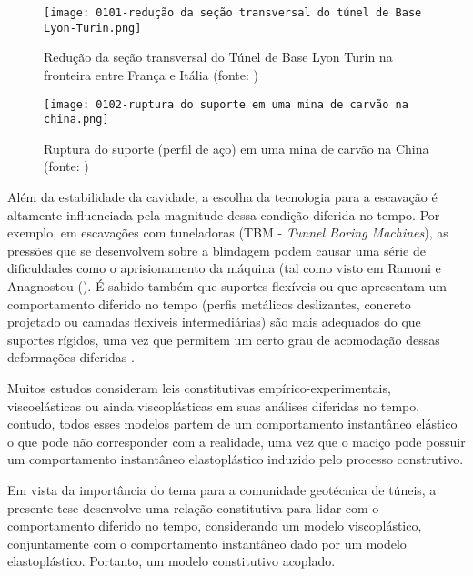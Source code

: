\begin{figure}[H]
	\begin{center}
		\texttt{[image: 0101-redução da seção transversal do túnel de Base Lyon-Turin.png]}
	\end{center}
	\caption{\label{redução_base_turin}Redução da seção transversal do Túnel de Base Lyon Turin na fronteira entre França e Itália (fonte: )}
\end{figure}

\begin{figure}[H]
	\begin{center}
		\texttt{[image: 0102-ruptura do suporte em uma mina de carvão na china.png]}
	\end{center}
	\caption{\label{ruptura_china}Ruptura do suporte (perfil de aço) em uma mina de carvão na China (fonte: )}
\end{figure}
 
Além da estabilidade da cavidade, a escolha da tecnologia para a escavação é altamente influenciada pela magnitude dessa condição diferida no tempo. Por exemplo, em escavações com tuneladoras (TBM - \textit{Tunnel Boring Machines}), as pressões que se desenvolvem sobre a blindagem podem causar uma série de dificuldades como o aprisionamento da máquina (tal como visto em Ramoni e Anagnostou (\citeyear{Ramoni2010a,Ramoni2010b}). É sabido também que suportes flexíveis ou que apresentam um comportamento diferido no tempo (perfis metálicos deslizantes, concreto projetado ou camadas flexíveis intermediárias) são mais adequados do que suportes rígidos, uma vez que permitem um certo grau de acomodação dessas deformações diferidas \cite{Wu2019}.

Muitos estudos consideram leis constitutivas empírico-experimentais, viscoelásticas ou ainda viscoplásticas em suas análises diferidas no tempo, contudo, todos esses modelos partem de um comportamento instantâneo elástico o que pode não corresponder com a realidade, uma vez que o maciço pode possuir um comportamento instantâneo elastoplástico induzido pelo processo construtivo.

Em vista da importância do tema para a comunidade geotécnica de túneis, a presente tese desenvolve uma relação constitutiva para lidar com o comportamento diferido no tempo, considerando um modelo viscoplástico, conjuntamente com o comportamento instantâneo dado por um modelo elastoplástico. Portanto, um modelo constitutivo acoplado.

